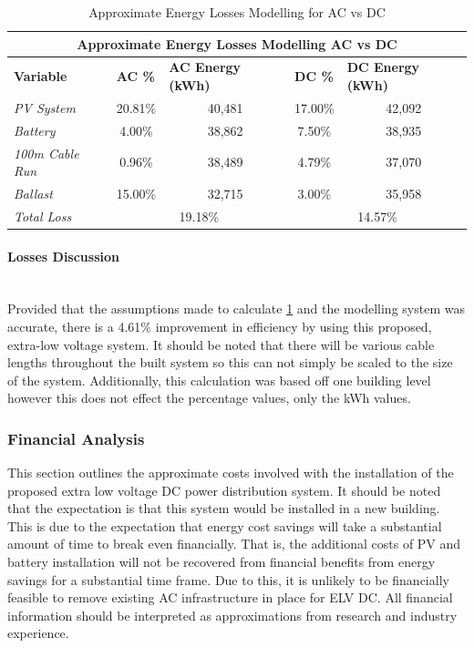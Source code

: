 \begin{table}[H]
	\centering
	\begin{tabular}{|l|c|c|c|c|}
		\hline
		\multicolumn{5}{|c|}{\textbf{Approximate Energy Losses Modelling AC vs DC}} \\ \hline
		\textbf{Variable} & \multicolumn{1}{l|}{\textbf{AC \%}} & \multicolumn{1}{l|}{\textbf{AC Energy (kWh)}} & \multicolumn{1}{l|}{\textbf{DC \%}} & \multicolumn{1}{l|}{\textbf{DC Energy (kWh)}} \\ \hline
		\textit{PV System} & 20.81\% & 40,481 & 17.00\% & 42,092 \\ \hline
		\textit{Battery} & 4.00\% \cite{website:Enphase-Battery-Data}  & 38,862 & 7.50\% \cite{website:Tesla-Powerwall-Data} & 38,935 \\ \hline
		\textit{100m Cable Run} & 0.96\% & 38,489 & 4.79\% & 37,070 \\ \hline
		\textit{Ballast} & 15.00\% \cite{website:AussieLightingCouncil} & 32,715 & 3.00\% \cite{website:LED-DC-DC-Driver} & 35,958 \\ \hline
		\textit{Total Loss} & \multicolumn{2}{c|}{19.18\%} & \multicolumn{2}{c|}{14.57\%} \\ \hline
	\end{tabular}
	\caption{Approximate Energy Losses Modelling for AC vs DC}
	\label{table:ac-vs-dc-system-loss-comparison}
\end{table} 
 
\paragraph{Losses Discussion}
~\\
Provided that the assumptions made to calculate \ref{table:ac-vs-dc-system-loss-comparison} and the modelling system was accurate, there is a 4.61\% improvement in efficiency by using this proposed, extra-low voltage system. It should be noted that there will be various cable lengths throughout the built system so this can not simply be scaled to the size of the system. Additionally, this calculation was based off one building level however this does not effect the percentage values, only the kWh values.



\subsubsection{Financial Analysis}

This section outlines the approximate costs involved with the installation of the proposed extra low voltage DC power distribution system. It should be noted that the expectation is that this system would be installed in a new building. This is due to the expectation that energy cost savings will take a substantial amount of time to break even financially. That is, the additional costs of PV and battery installation will not be recovered from financial benefits from energy savings for a substantial time frame. Due to this, it is unlikely to be financially feasible to remove existing AC infrastructure in place for ELV DC. All financial information should be interpreted as approximations from research and industry experience.     

